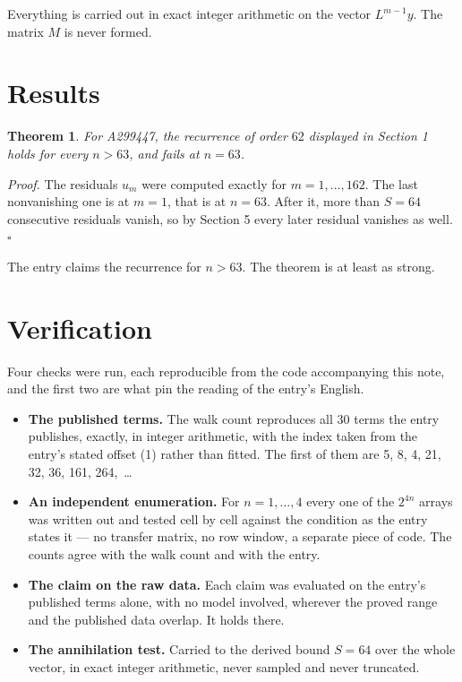 \documentclass[11pt]{article}
\newtheorem{theorem}{Theorem}
\theoremstyle{definition}
\begin{document}
Everything is carried out in exact integer arithmetic on the vector $L^{m-1}y$. The matrix $M$ is never formed.

\section{Results}

\begin{theorem} For A299447, the recurrence of order $62$ displayed in Section 1 holds for every $n > 63$, and fails at $n = 63$.\end{theorem}

{\itshape Proof.} The residuals $u_m$ were computed exactly for $m = 1,\dots,162$. The last nonvanishing one is at $m = 1$, that is at $n = 63$. After it, more than $S = 64$ consecutive residuals vanish, so by Section 5 every later residual vanishes as well. $\square$

The entry claims the recurrence for $n > 63$. The theorem is at least as strong.

\section{Verification}

Four checks were run, each reproducible from the code accompanying this note, and the first two are what pin the reading of the entry's English.

\begin{itemize}

\item {\bfseries The published terms.} The walk count reproduces all 30 terms the entry publishes, exactly, in integer arithmetic, with the index taken from the entry's stated offset (1) rather than fitted. The first of them are 5, 8, 4, 21, 32, 36, 161, 264,~\dots

\item {\bfseries An independent enumeration.} For $n = 1,\dots,4$ every one of the $2^{4n}$ arrays was written out and tested cell by cell against the condition as the entry states it --- no transfer matrix, no row window, a separate piece of code. The counts agree with the walk count and with the entry.

\item {\bfseries The claim on the raw data.} Each claim was evaluated on the entry's published terms alone, with no model involved, wherever the proved range and the published data overlap. It holds there.

\item {\bfseries The annihilation test.} Carried to the derived bound $S = 64$ over the whole vector, in exact integer arithmetic, never sampled and never truncated.

\end{itemize}
\end{document}
